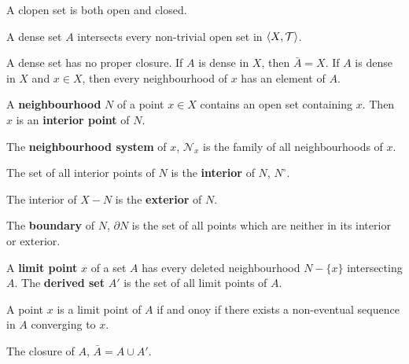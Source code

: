 \begin{definition}[clopen]
	A clopen set is both open and closed.
\end{definition}

\begin{definition}[dense]
	A dense set $A$ intersects every non-trivial open set in $\left\langle X,\mathcal{T} \right\rangle$.
\end{definition}
\begin{note}
	A dense set has no proper closure.
	If $A$ is dense in $X$, then $\bar{A} = X$.
	If $A$ is dense in $X$ and $x \in X$, then every neighbourhood of $x$ has an element of $A$.
\end{note}

\begin{definition}[neighbourhood]
	A \textbf{neighbourhood} $N$ of a point $x \in X$ contains an open set containing $x$.
	Then $x$ is an \textbf{interior point} of $N$.
\end{definition}
\begin{definition}
	The \textbf{neighbourhood system} of $x$, $\mathcal{N}_x$ is the family of all neighbourhoods of $x$.
\end{definition}
\begin{definition}[interior]
	The set of all interior points of $N$ is the \textbf{interior} of $N$, $N^\circ$.
\end{definition}
\begin{definition}[exterior]
	The interior of $X-N$ is the \textbf{exterior} of $N$.
\end{definition}
\begin{definition}[boundary]
	The \textbf{boundary} of $N$, $\partial N$ is the set of all points which are neither in its interior or exterior.
\end{definition}

\begin{definition}
	A \textbf{limit point} $x$ of a set $A$ has every deleted neighbourhood $N-\{x\}$ intersecting $A$.
	The \textbf{derived set} $A'$ is the set of all limit points of $A$.
\end{definition}

\begin{note}
	A point $x$ is a limit point of $A$ if and onoy if there exists a non-eventual sequence in $A$ converging to $x$.
\end{note}

\begin{definition}[closure]
	The closure of $A$, $\bar{A} = A \cup A'$.
\end{definition}

